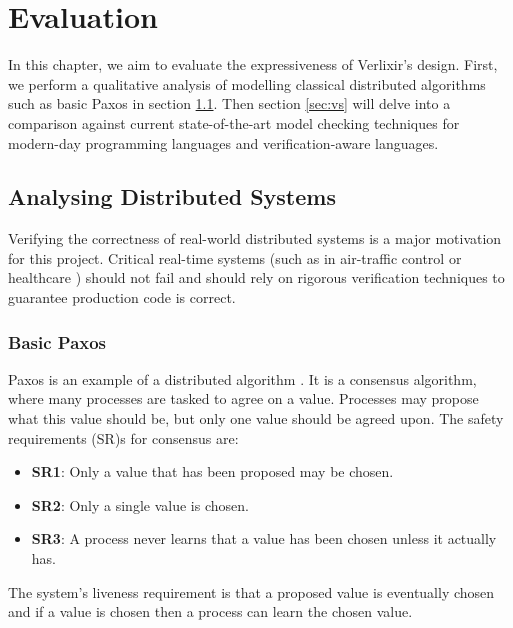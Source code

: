 \chapter{Evaluation}
In this chapter, we aim to evaluate the expressiveness of Verlixir's design. First, we perform a qualitative analysis of modelling classical distributed algorithms such as basic Paxos in section \ref{sec:ds}. Then section \ref{sec:vs} will delve into a comparison against current state-of-the-art model checking techniques for modern-day programming languages and verification-aware languages.
\section{Analysing Distributed Systems} \label{sec:ds}
Verifying the correctness of real-world distributed systems is a major motivation for this project. Critical real-time systems (such as in air-traffic control or healthcare  \cite{airlines,healthcare}) should not fail and should rely on rigorous verification techniques to guarantee production code is correct.  
\subsection{Basic Paxos} \label{sec:Paxos}
Paxos is an example of a distributed algorithm \cite{paxos_simple}. It is a consensus algorithm, where many processes are tasked to agree on a value. Processes may propose what this value should be, but only one value should be agreed upon. The safety requirements (SR)s for consensus are:
\begin{itemize}
    \item \textbf{SR1}: Only a value that has been proposed may be chosen.
    \item \textbf{SR2}: Only a single value is chosen.
    \item \textbf{SR3}: A process never learns that a value has been chosen unless it actually has.
\end{itemize}
The system's liveness requirement is that a proposed value is eventually chosen and if a value is chosen then a process can learn the chosen value.
